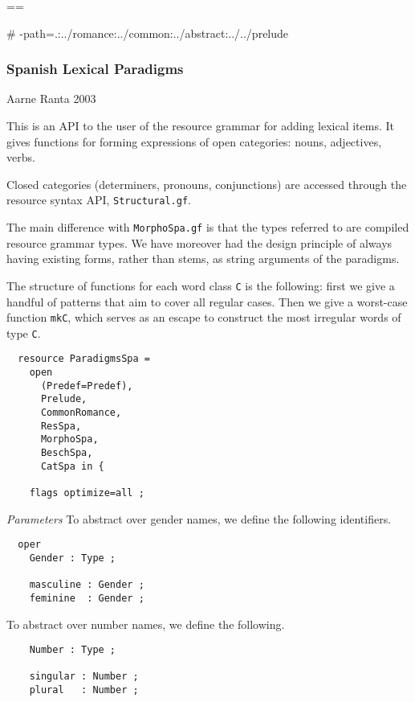 \documentclass[11pt,a4paper]{article}
\newcommand{\commOut}[1]{}
\newcommand{\subsubsubsection}[1]{\textit{#1}}
\begin{document}
\commOut{Produced by 
gfdoc - a rudimentary GF document generator.
(c) Aarne Ranta (\htmladdnormallink{aarne@cs.chalmers.se}{mailto:aarne@cs.chalmers.se}) 2002 under GNU GPL.}

==

\# -path=.:../romance:../common:../abstract:../../prelude


\subsubsection{Spanish Lexical Paradigms}
Aarne Ranta 2003

This is an API to the user of the resource grammar 
for adding lexical items. It gives functions for forming
expressions of open categories: nouns, adjectives, verbs.

Closed categories (determiners, pronouns, conjunctions) are
accessed through the resource syntax API, \texttt{Structural.gf}. 

The main difference with \texttt{MorphoSpa.gf} is that the types
referred to are compiled resource grammar types. We have moreover
had the design principle of always having existing forms, rather
than stems, as string arguments of the paradigms.

The structure of functions for each word class \texttt{C} is the following:
first we give a handful of patterns that aim to cover all
regular cases. Then we give a worst-case function \texttt{mkC}, which serves as an
escape to construct the most irregular words of type \texttt{C}.

\begin{verbatim}
  resource ParadigmsSpa = 
    open 
      (Predef=Predef), 
      Prelude, 
      CommonRomance, 
      ResSpa, 
      MorphoSpa, 
      BeschSpa,
      CatSpa in {
  
    flags optimize=all ;
\end{verbatim}

\subsubsubsection{Parameters}
To abstract over gender names, we define the following identifiers.

\begin{verbatim}
  oper
    Gender : Type ; 
  
    masculine : Gender ;
    feminine  : Gender ;
\end{verbatim}

To abstract over number names, we define the following.

\begin{verbatim}
    Number : Type ; 
  
    singular : Number ;
    plural   : Number ;
\end{verbatim}
\end{document}
